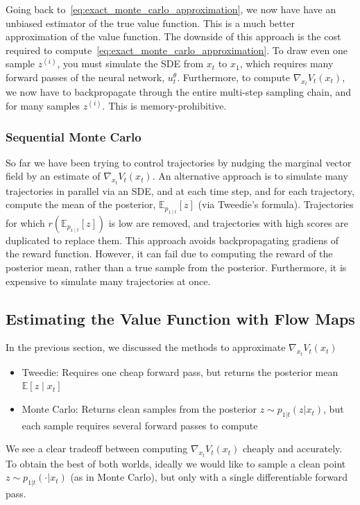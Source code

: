 \documentclass[12pt,a4paper]{report}
\begin{document}
Going back to~\ref{eq:exact_monte_carlo_approximation}, we now have have an unbiased estimator of the true value function. This is a much better approximation of the value function. The downside of this approach is the cost required to compute~\ref{eq:exact_monte_carlo_approximation}. To draw even one sample $z^{(i)}$, you must simulate the SDE from $x_t$ to $x_1$, which requires many forward passes of the neural network, $u_t^\theta$. Furthermore, to compute $\nabla_{x_t}V_t(x_t)$, we now have to backpropagate through the entire multi-step sampling chain, and for many samples $z^{(i)}$. This is memory-prohibitive. 

\subsubsection{Sequential Monte Carlo} 
So far we have been trying to control trajectories by nudging the marginal vector field by an estimate of $\nabla_{x_t}V_t(x_t)$. An alternative approach is to simulate many trajectories in parallel via an SDE, and at each time step, and for each trajectory, compute the mean of the posterior, $\mathbb{E}_{p_{1 \mid t}}[z]$ (via Tweedie's formula). Trajectories for which $r(\mathbb{E}_{p_{1 \mid t}}[z])$ is low are removed, and trajectories with high scores are duplicated to replace them. This approach avoids backpropagating gradiens of the reward function. However, it can fail due to computing the reward of the posterior mean, rather than a true sample from the posterior. Furthermore, it is expensive to simulate many trajectories at once. 

\subsection{Estimating the Value Function with Flow Maps}

In the previous section, we discussed the methods to approximate $\nabla_{x_t}V_t(x_t)$
\begin{itemize}
    \item Tweedie: Requires one cheap forward pass, but returns the posterior mean $\mathbb{E}[z \mid x_t]$
    \item Monte Carlo: Returns clean samples from the posterior $z \sim p_{1|t}(z|x_t)$, but each sample requires several forward passes to compute
\end{itemize}
We see a clear tradeoff between computing $\nabla_{x_t}V_t(x_t)$ cheaply and accurately. To obtain the best of both worlds, ideally we would like to sample a clean point $z \sim p_{1|t}(\cdot|x_t)$ (as in Monte Carlo), but only with a single differentiable forward pass. 
\end{document}

